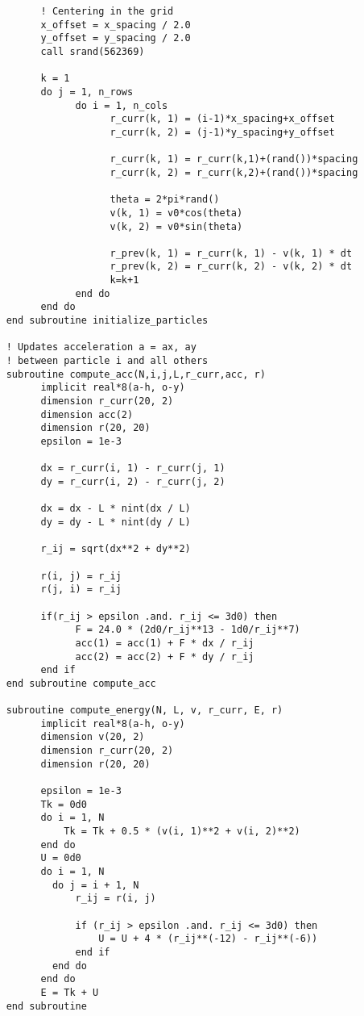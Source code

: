 \begin{verbatim}
          ! Centering in the grid
          x_offset = x_spacing / 2.0 
          y_offset = y_spacing / 2.0
          call srand(562369)

          k = 1 
          do j = 1, n_rows 
                do i = 1, n_cols 
                      r_curr(k, 1) = (i-1)*x_spacing+x_offset
                      r_curr(k, 2) = (j-1)*y_spacing+y_offset
                      
                      r_curr(k, 1) = r_curr(k,1)+(rand())*spacing
                      r_curr(k, 2) = r_curr(k,2)+(rand())*spacing

                      theta = 2*pi*rand()
                      v(k, 1) = v0*cos(theta)
                      v(k, 2) = v0*sin(theta)
                      
                      r_prev(k, 1) = r_curr(k, 1) - v(k, 1) * dt 
                      r_prev(k, 2) = r_curr(k, 2) - v(k, 2) * dt 
                      k=k+1
                end do 
          end do
    end subroutine initialize_particles

    ! Updates acceleration a = ax, ay 
    ! between particle i and all others
    subroutine compute_acc(N,i,j,L,r_curr,acc, r)
          implicit real*8(a-h, o-y)
          dimension r_curr(20, 2)
          dimension acc(2)
          dimension r(20, 20)
          epsilon = 1e-3

          dx = r_curr(i, 1) - r_curr(j, 1)
          dy = r_curr(i, 2) - r_curr(j, 2)

          dx = dx - L * nint(dx / L)
          dy = dy - L * nint(dy / L)

          r_ij = sqrt(dx**2 + dy**2)
          
          r(i, j) = r_ij 
          r(j, i) = r_ij

          if(r_ij > epsilon .and. r_ij <= 3d0) then 
                F = 24.0 * (2d0/r_ij**13 - 1d0/r_ij**7)
                acc(1) = acc(1) + F * dx / r_ij 
                acc(2) = acc(2) + F * dy / r_ij
          end if 
    end subroutine compute_acc

    subroutine compute_energy(N, L, v, r_curr, E, r)
          implicit real*8(a-h, o-y)
          dimension v(20, 2)
          dimension r_curr(20, 2)
          dimension r(20, 20)
          
          epsilon = 1e-3
          Tk = 0d0
          do i = 1, N
              Tk = Tk + 0.5 * (v(i, 1)**2 + v(i, 2)**2)
          end do
          U = 0d0
          do i = 1, N
            do j = i + 1, N
                r_ij = r(i, j)

                if (r_ij > epsilon .and. r_ij <= 3d0) then
                    U = U + 4 * (r_ij**(-12) - r_ij**(-6))
                end if
            end do
          end do
          E = Tk + U
    end subroutine
\end{verbatim}
